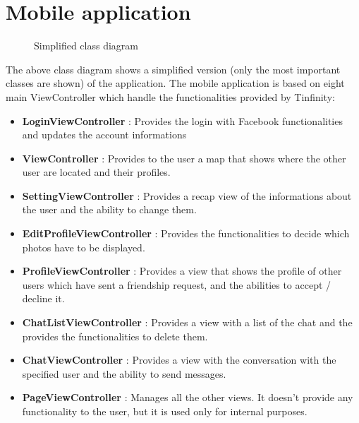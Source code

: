 \section{Mobile application} 

\begin{figure}[H]
\caption{Simplified class diagram}
\end{figure}



The above class diagram shows a simplified version (only the most important classes are shown) of the application. The mobile application is based on eight main ViewController which handle the functionalities provided by Tinfinity:
\begin{itemize}
\item \textbf{LoginViewController} : Provides the login with Facebook functionalities and updates the account informations
\item \textbf{ViewController} : Provides to the user a map that shows where the other user are located and their profiles.
\item \textbf{SettingViewController} : Provides a recap view of the informations about the user and the ability to change them.
\item \textbf{EditProfileViewController} : Provides the functionalities to decide which photos have to be displayed.
\item \textbf{ProfileViewController} : Provides a view that shows the profile of other users which have sent a friendship request, and the abilities to accept / decline it.
\item \textbf{ChatListViewController} : Provides a view with a list of the chat and the provides the functionalities to delete them.
\item \textbf{ChatViewController} : Provides a view with the conversation with the specified user and the ability to send messages.
\item \textbf{PageViewController} : Manages all the other views. It doesn't provide any functionality to the user, but it is used only for internal purposes.
\end{itemize}  

